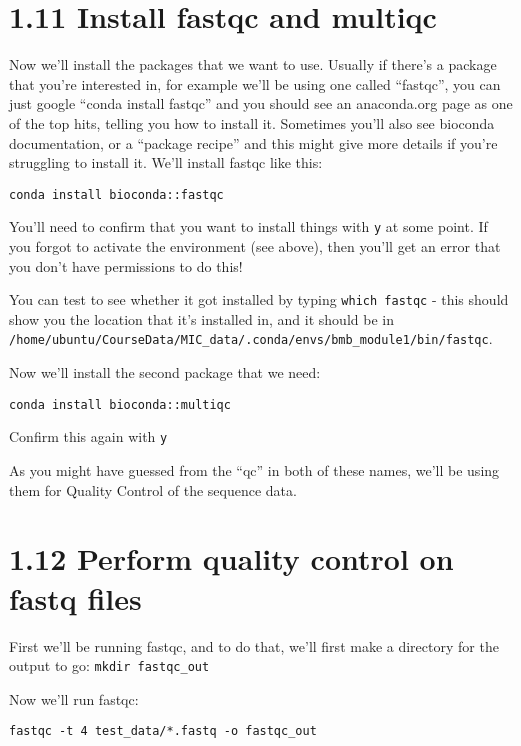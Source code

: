 \documentclass[
]{book}
\begin{document}
\section{1.11 Install fastqc and multiqc}\label{install-fastqc-and-multiqc}

Now we'll install the packages that we want to use. Usually if there's a package that you're interested in, for example we'll be using one called ``fastqc'', you can just google ``conda install fastqc'' and you should see an anaconda.org page as one of the top hits, telling you how to install it. Sometimes you'll also see bioconda documentation, or a ``package recipe'' and this might give more details if you're struggling to install it. We'll install fastqc like this:

\begin{verbatim}
conda install bioconda::fastqc
\end{verbatim}

You'll need to confirm that you want to install things with \texttt{y} at some point. If you forgot to activate the environment (see above), then you'll get an error that you don't have permissions to do this!

You can test to see whether it got installed by typing \texttt{which\ fastqc} - this should show you the location that it's installed in, and it should be in \texttt{/home/ubuntu/CourseData/MIC\_data/.conda/envs/bmb\_module1/bin/fastqc}.

Now we'll install the second package that we need:

\begin{verbatim}
conda install bioconda::multiqc
\end{verbatim}

Confirm this again with \texttt{y}

As you might have guessed from the ``qc'' in both of these names, we'll be using them for Quality Control of the sequence data.

\section{1.12 Perform quality control on fastq files}\label{perform-quality-control-on-fastq-files}

First we'll be running fastqc, and to do that, we'll first make a directory for the output to go: \texttt{mkdir\ fastqc\_out}

Now we'll run fastqc:

\begin{verbatim}
fastqc -t 4 test_data/*.fastq -o fastqc_out
\end{verbatim}
\end{document}
